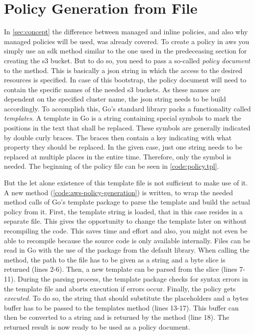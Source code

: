 \section{Policy Generation from File}
In \autoref{sec:concept} the difference between managed and inline policies, and also why managed policies will be used, was already covered.
To create a policy in \ac{aws} you simply use an \ac{sdk} method similar to the one used in the predeceasing section for creating the \ac{s3} bucket.
But to do so, you need to pass a so-called \emph{policy document} to the method.
This is basically a \ac{json} string in which the access to the desired resources is specified.
In case of this bootstrap, the policy document will need to contain the specific names of the needed \ac{s3} buckets.
As these names are dependent on the specified cluster name, the \ac{json} string needs to be build accordingly.
To accomplish this, Go's standard library packs a functionality called \emph{templates}.
A template in Go is a string containing special symbols to mark the positions in the text that shall be replaced.
These symbols are generally indicated by double curly braces.
The braces then contain a key indicating with what property they should be replaced.
In the given case, just one string needs to be replaced at multiple places in the entire time.
Therefore, only the symbol  is needed.
The beginning of the policy file can be seen in \autoref{code:policy.tpl}.



But the let alone existence of this template file is not sufficient to make use of it.
A new method (\autoref{code:aws-policy-generation}) is written, to wrap the needed method calls of Go's template package to parse the template and build the actual policy from it.
First, the template string is loaded, that in this case resides in a separate file.
This gives the opportunity to change the template later on without recompiling the code.
This saves time and effort and also, you might not even be able to recompile because the source code is only available internally.
Files can be read in Go with the use of the  package from the default library.
When calling the  method, the path to the file has to be given as a string and a byte slice is returned (lines 2-6).
Then, a new template can be parsed from the slice (lines 7-11).
During the parsing process, the template package checks for syntax errors in the template file and aborts execution if errors occur.
Finally, the policy gets \emph{executed}.
To do so, the string that should substitute the placeholders and a bytes buffer has to be passed to the templates  method (lines 13-17).
This buffer can then be converted to a string and is returned by the method (line 18).
The returned result is now ready to be used as a policy document.

